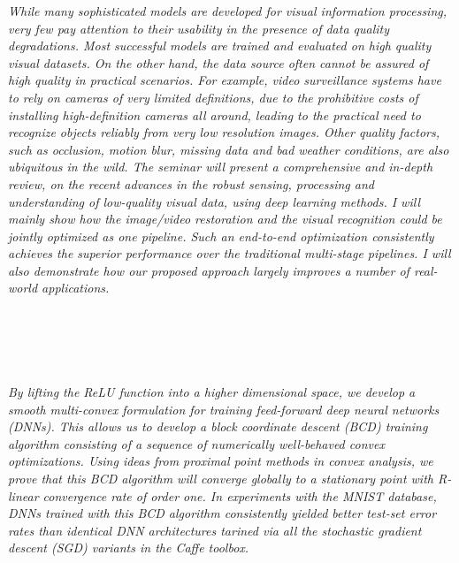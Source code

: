 \begin{multicols}{2}
\\ 
        \\
        \\\\
\\
      \textit{While many sophisticated models are developed for visual information processing, very few pay attention to their usability in the presence of data quality degradations. Most successful models are trained and evaluated on high quality visual datasets. On the other hand, the data source often cannot be assured of high quality in practical scenarios. For example, video surveillance systems have to rely on cameras of very limited definitions, due to the prohibitive costs of installing high-definition cameras all around, leading to the practical need to recognize objects reliably from very low resolution images. Other quality factors, such as occlusion, motion blur, missing data and bad weather conditions, are also ubiquitous in the wild. The seminar will present a comprehensive and in-depth review, on the recent advances in the robust sensing, processing and understanding of low-quality visual data, using deep learning methods. I will mainly show how the image/video restoration and the visual recognition could be jointly optimized as one pipeline. Such an end-to-end optimization consistently achieves the superior performance over the traditional multi-stage pipelines. I will also demonstrate how our proposed approach largely improves a number of real-world applications.}\\
\\ 
        \\
        \\\\
\\
      \textit{By lifting the ReLU function into a higher dimensional space, we develop a smooth multi-convex formulation for training feed-forward deep neural networks (DNNs). This allows us to develop a block coordinate descent (BCD) training algorithm consisting of a sequence of numerically well-behaved convex optimizations. Using ideas from proximal point methods in convex analysis, we prove that this BCD algorithm will converge globally to a stationary point with R-linear convergence rate of order one. In experiments with the MNIST database, DNNs trained with this BCD algorithm consistently yielded better test-set error rates than identical DNN architectures tarined via all the stochastic gradient descent (SGD) variants in the Caffe toolbox.}\\

\end{multicols}
